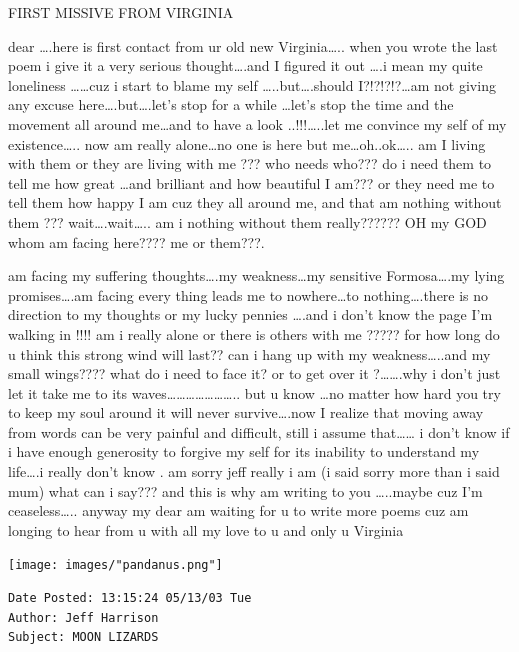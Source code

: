 \documentclass[
]{memoir}
\begin{document}
FIRST MISSIVE FROM VIRGINIA

dear \ldots{}.here is first contact from ur old new Virginia\ldots{}..
when you wrote the last poem i give it a very serious
thought\ldots{}.and I figured it out \ldots{}.i mean my quite loneliness
\ldots{}\ldots{}cuz i start to blame my self
\ldots{}..but\ldots{}.should I?!?!?!?\ldots{}am not giving any excuse
here\ldots{}.but\ldots{}.let's stop for a while \ldots{}let's stop the
time and the movement all around me\ldots{}and to have a look
..!!!\ldots{}..let me convince my self of my existence\ldots{}.. now am
really alone\ldots{}no one is here but me\ldots{}oh..ok\ldots{}.. am I
living with them or they are living with me ??? who needs who??? do i
need them to tell me how great \ldots{}and brilliant and how beautiful I
am??? or they need me to tell them how happy I am cuz they all around
me, and that am nothing without them ??? wait\ldots{}.wait\ldots{}.. am
i nothing without them really?????? OH my GOD whom am facing here???? me
or them???.

am facing my suffering thoughts\ldots{}.my weakness\ldots{}my sensitive
Formosa\ldots{}.my lying promises\ldots{}.am facing every thing leads me
to nowhere\ldots{}to nothing\ldots{}.there is no direction to my
thoughts or my lucky pennies \ldots{}.and i don't know the page I'm
walking in !!!! am i really alone or there is others with me ????? for
how long do u think this strong wind will last?? can i hang up with my
weakness\ldots{}..and my small wings???? what do i need to face it? or
to get over it ?\ldots{}\ldots{}.why i don't just let it take me to its
waves\ldots{}\ldots{}\ldots{}\ldots{}\ldots{}\ldots{}\ldots{}.. but u
know \ldots{}no matter how hard you try to keep my soul around it will
never survive\ldots{}.now I realize that moving away from words can be
very painful and difficult, still i assume that\ldots{}\ldots{} i don't
know if i have enough generosity to forgive my self for its inability to
understand my life\ldots{}.i really don't know . am sorry jeff really i
am (i said sorry more than i said mum) what can i say??? and this is why
am writing to you \ldots{}..maybe cuz I'm ceaseless\ldots{}.. anyway my
dear am waiting for u to write more poems cuz am longing to hear from u
with all my love to u and only u Virginia

\begin{center}\texttt{[image: images/"pandanus.png"]}\end{center}

\begin{verbatim}
Date Posted: 13:15:24 05/13/03 Tue
Author: Jeff Harrison
Subject: MOON LIZARDS
\end{verbatim}
\end{document}
